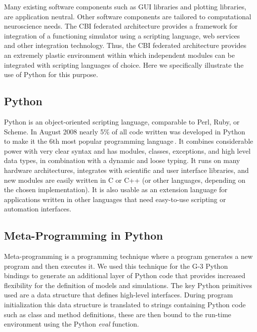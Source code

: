 \documentclass[12pt]{article}
\begin{document}
Many existing software components such as GUI libraries and plotting
libraries, are application neutral.  Other software components are
tailored to computational neuroscience needs.  The CBI federated
architecture provides a framework for integration of a functioning
simulator using a scripting language, web services and other
integration technology.  Thus, the CBI federated architecture provides
an extremely plastic environment within which independent modules can
be integrated with scripting languages of choice.  Here we
specifically illustrate the use of Python for this purpose.

\subsection{Python}

Python is an object-oriented scripting language, comparable to Perl,
Ruby, or Scheme.  In August 2008 nearly 5\% of all code written was
developed in Python to make it the 6th most popular programming
language\,\cite{software09:_tiobe_progr_commun_index}. It combines
considerable power with very clear syntax and has modules, classes,
exceptions, and high level data types, in combination with a dynamic
and loose typing. It runs on many hardware architectures, integrates
with scientific and user interface libraries, and new modules are
easily written in C or C++ (or other languages, depending on the
chosen implementation). It is also usable as an extension language for
applications written in other languages that need easy-to-use
scripting or automation interfaces.


\subsection{Meta-Programming in Python}

Meta-programming is a programming technique where a program generates
a new program and then executes it.  We used this technique for the G-3
Python bindings to generate an additional layer of Python code that
provides increased flexibility for the definition of models and
simulations.  The key Python primitives used are a data structure that
defines high-level interfaces.  During program initialization this
data structure is translated to strings containing Python code such as
class and method definitions, these are then bound to the run-time
environment using the Python {\it eval} function.
\end{document}

